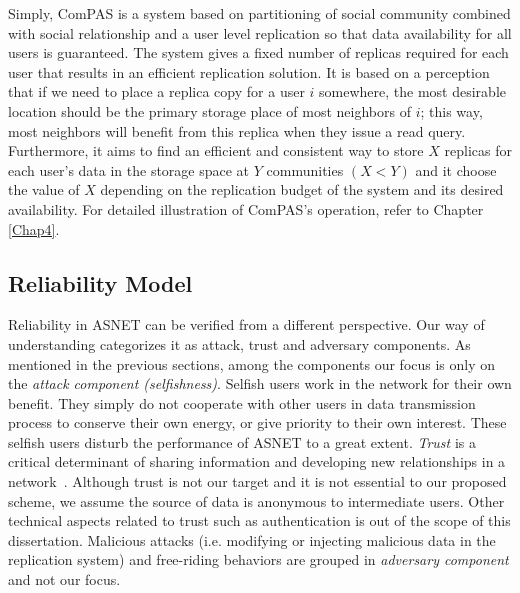 Simply, ComPAS is a system based on partitioning of social community combined with social relationship and a user level replication so that data availability for all users is guaranteed. The system gives a fixed number of replicas required for each user that results in an efficient replication solution. It is based on a perception that if we need to place a replica copy for a user $i$ somewhere, the most desirable location should be the primary storage place of most neighbors of $i$; this way, most neighbors will benefit from this replica when they issue a read query. Furthermore, it aims to find an efficient and consistent way to store $X$ replicas for each user's data in the storage space at $Y$ communities $(X < Y)$ and it choose the value of $X$ depending on the replication budget of the system and its desired availability. For detailed illustration of ComPAS's operation, refer to Chapter \ref{Chap4}.

\subsection{Reliability Model}\label{Chap6_03_03}
Reliability in ASNET can be verified from a different perspective. Our way of understanding categorizes it as attack, trust and adversary components.  As mentioned in the previous sections, among the components our focus is only on the {\it attack component (selfishness)}. Selfish users work in the network for their own benefit. They simply do not cooperate with other users in data transmission process to conserve their own energy, or give priority to their own interest. These selfish users disturb the performance of ASNET to a great extent. {\it Trust} is a critical determinant of sharing information and developing new relationships in a network~\cite{YNajaflou}. Although trust is not our target and it is not essential to our proposed scheme, we assume the source of data is anonymous to intermediate users. Other technical aspects related to trust such as authentication is out of the scope of this dissertation. Malicious attacks (i.e. modifying or injecting malicious data in the replication system) and free-riding behaviors are grouped in {\it adversary component} and not our focus.

